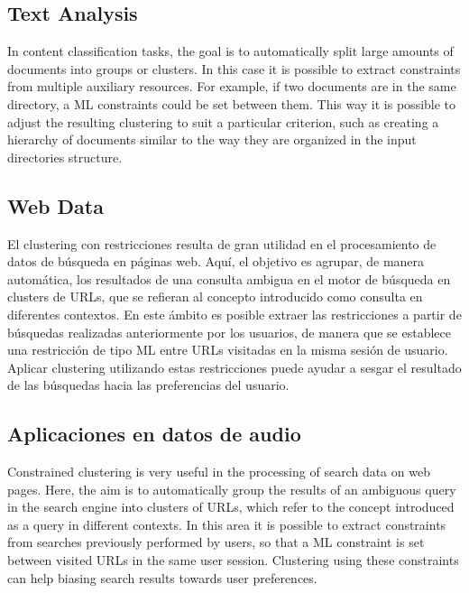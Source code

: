 \subsection{Text Analysis}

In content classification tasks, the goal is to automatically split large amounts of documents into groups or clusters. In this case it is possible to extract constraints from multiple auxiliary resources. For example, if two documents are in the same directory, a \acf{ML} constraints could be set between them. This way it is possible to adjust the resulting clustering to suit a particular criterion, such as creating a hierarchy of documents similar to the way they are organized in the input directories structure.

\subsection{Web Data} 

El clustering con restricciones resulta de gran utilidad en el procesamiento de datos de búsqueda en páginas web. Aquí, el objetivo es agrupar, de manera automática, los resultados de una consulta ambigua en el motor de búsqueda en clusters de \acs{URL}s, que se refieran al concepto introducido como consulta en diferentes contextos. En este ámbito es posible extraer las restricciones a partir de búsquedas realizadas anteriormente por los usuarios, de manera que se establece una restricción de tipo \acf{ML} entre \acs{URL}s visitadas en la misma sesión de usuario. Aplicar clustering utilizando estas restricciones puede ayudar a sesgar el resultado de las búsquedas hacia las preferencias del usuario.

\subsection{Aplicaciones en datos de audio}

Constrained clustering is very useful in the processing of search data on web pages. Here, the aim is to automatically group the results of an ambiguous query in the search engine into clusters of \acs{URL}s, which refer to the concept introduced as a query in different contexts. In this area it is possible to extract constraints from searches previously performed by users, so that a \acf{ML} constraint is set between visited \acs{URL}s in the same user session. Clustering using these constraints can help biasing search results towards user preferences.

